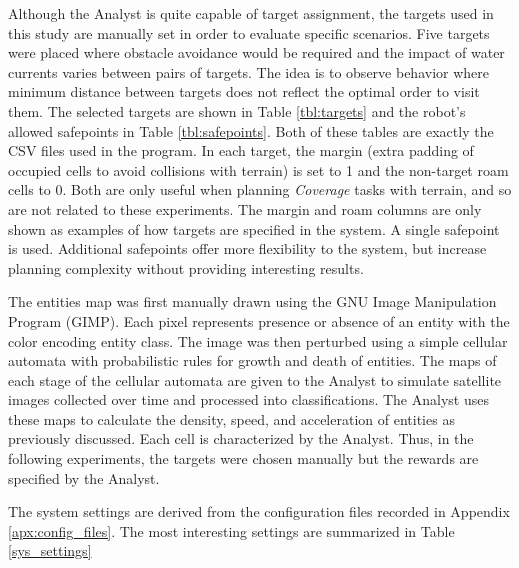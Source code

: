 \documentclass{tamuccthesis}
\begin{document}
Although the Analyst is quite capable of target assignment, the targets used in this study are manually set in order to evaluate specific scenarios. Five targets were placed where obstacle avoidance would be required and the impact of water currents varies between pairs of targets. The idea is to observe behavior where minimum distance between targets does not reflect the optimal order to visit them. The selected targets are shown in Table \ref{tbl:targets} and the robot's allowed safepoints in Table \ref{tbl:safepoints}. Both of these tables are exactly the CSV files used in the program. In each target, the margin (extra padding of occupied cells to avoid collisions with terrain) is set to 1 and the non-target roam cells to 0. Both are only useful when planning \textit{Coverage} tasks with terrain, and so are not related to these experiments. The margin and roam columns are only shown as examples of how targets are specified in the system. A single safepoint is used. Additional safepoints offer more flexibility to the system, but increase planning complexity without providing interesting results. 

The entities map was first manually drawn using the GNU Image Manipulation Program (GIMP). Each pixel represents presence or absence of an entity with the color encoding entity class. The image was then perturbed using a simple cellular automata with probabilistic rules for growth and death of entities. The maps of each stage of the cellular automata are given to the Analyst to simulate satellite images collected over time and processed into classifications. The Analyst uses these maps to calculate the density, speed, and acceleration of entities as previously discussed. Each cell is characterized by the Analyst. Thus, in the following experiments, the targets were chosen manually but the rewards are specified by the Analyst.

The system settings are derived from the configuration files recorded in Appendix \ref{apx:config_files}. The most interesting settings are summarized in Table \ref{sys_settings}
\end{document}
